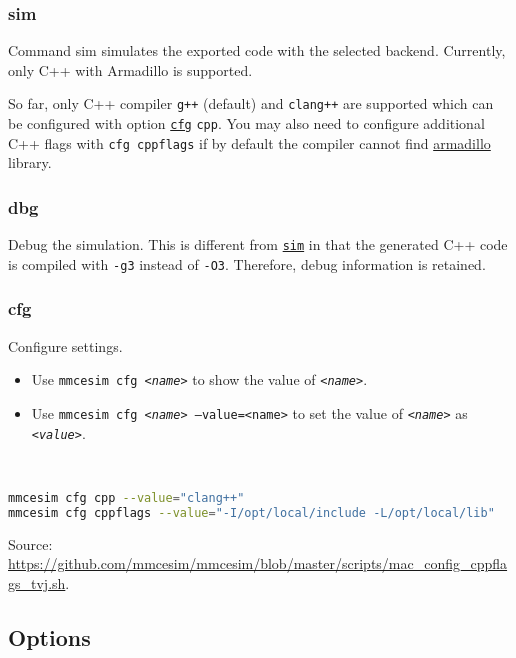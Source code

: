 \subsubsection{sim}\label{d:subsec:sim}
Command sim simulates the exported code with the selected backend. Currently, only C++ with Armadillo is supported.

So far, only C++ compiler \texttt{g++} (default) and \texttt{clang++} are supported which can be configured with option \hyperref[d:subsec:cfg]{\texttt{cfg}} \texttt{cpp}.
You may also need to configure additional C++ flags with \texttt{cfg cppflags} if by default the compiler cannot find
\href{https://arma.sourceforge.net/}{armadillo}
library.

\subsubsection{dbg}
Debug the simulation.
This is different from \hyperref[d:subsec:sim]{\texttt{sim}} in that the generated C++ code is compiled with \texttt{-g3} instead of \texttt{-O3}.
Therefore, debug information is retained.

\subsubsection{cfg}\label{d:subsec:cfg}
Configure settings.

\begin{itemize}
  \item Use \texttt{mmcesim cfg \textit{<name>}} to show the value of \texttt{\textit{<name>}}.
  \item Use \texttt{mmcesim cfg \textit{<name>} --value=\texttt{<name>}} to set the value of \texttt{\textit{<name>}} as \texttt{\textit{<value>}}.
\end{itemize}

\begin{example}[Configure C++]~
  \begin{lstlisting}[language=sh]
mmcesim cfg cpp --value="clang++"
mmcesim cfg cppflags --value="-I/opt/local/include -L/opt/local/lib"
  \end{lstlisting}
  {\small Source: \url{https://github.com/mmcesim/mmcesim/blob/master/scripts/mac_config_cppflags_tvj.sh}.}
\end{example}

\subsection{Options}

